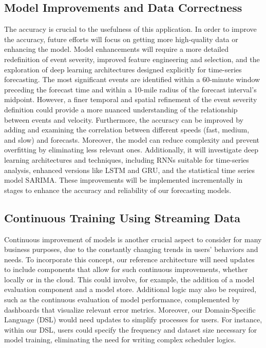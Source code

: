\subsection{Model Improvements and Data Correctness}
The accuracy is crucial to the usefulness of this application. In order to improve the accuracy, future efforts will focus on getting more high-quality data or enhancing the model. Model enhancements will require a more detailed redefinition of event severity, improved feature engineering and selection, and the exploration of deep learning architectures designed explicitly for time-series forecasting. The most significant events are identified within a 60-minute window preceding the forecast time and within a 10-mile radius of the forecast interval's midpoint. However, a finer temporal and spatial refinement of the event severity definition could provide a more nuanced understanding of the relationship between events and velocity.
Furthermore, the accuracy can be improved by adding and examining the correlation between different speeds (fast, medium, and slow) and forecasts. Moreover, the model can reduce complexity and prevent overfitting by eliminating less relevant ones. Additionally, it will investigate deep learning architectures and techniques, including RNNs suitable for time-series analysis, enhanced versions like LSTM and GRU, and the statistical time series model SARIMA. These improvements will be implemented incrementally in stages to enhance the accuracy and reliability of our forecasting models.

\subsection{Continuous Training Using Streaming Data}

Continuous improvement of models is another crucial aspect to consider for many business purposes, due to the constantly changing trends in users' behaviors and needs. To incorporate this concept, our reference architecture will need updates to include components that allow for such continuous improvements, whether locally or in the cloud. This could involve, for example, the addition of a model evaluation component and a model store. Additional logic may also be required, such as the continuous evaluation of model performance, complemented by dashboards that visualize relevant error metrics. Moreover, our Domain-Specific Language (DSL) would need updates to simplify processes for users. For instance, within our DSL, users could specify the frequency and dataset size necessary for model training, eliminating the need for writing complex scheduler logics.

